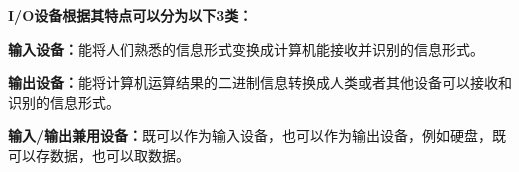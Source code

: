 {\textbf{I/O设备根据其特点可以分为以下3类：}}

\textbf{输入设备：}能将人们熟悉的信息形式变换成计算机能接收并识别的信息形式。

\textbf{输出设备：}能将计算机运算结果的二进制信息转换成人类或者其他设备可以接收和识别的信息形式。

\textbf{输入/输出兼用设备：}既可以作为输入设备，也可以作为输出设备，例如硬盘，既可以存数据，也可以取数据。\\
